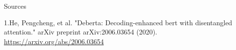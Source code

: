 \documentclass{beamer}
\begin{document}
\begin{frame}{Sources}
\begin{thebibliography}{0}

   1.He, Pengcheng, et al. "Deberta: Decoding-enhanced bert with disentangled attention." arXiv preprint arXiv:2006.03654 (2020). \url{https://arxiv.org/abs/2006.03654} 
  
  
\end{thebibliography}

\end{frame}

 
\end{document}
